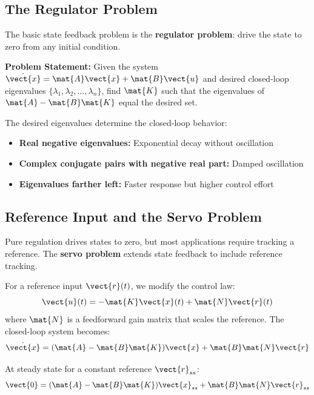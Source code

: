 \subsection{The Regulator Problem}

The basic state feedback problem is the \textbf{regulator problem}: drive the state to zero from any initial condition.

\textbf{Problem Statement:} Given the system $\dot{\vect{x}} = \mat{A}\vect{x} + \mat{B}\vect{u}$ and desired closed-loop eigenvalues $\{\lambda_1, \lambda_2, \ldots, \lambda_n\}$, find $\mat{K}$ such that the eigenvalues of $\mat{A} - \mat{B}\mat{K}$ equal the desired set.

The desired eigenvalues determine the closed-loop behavior:
\begin{itemize}
    \item \textbf{Real negative eigenvalues:} Exponential decay without oscillation
    \item \textbf{Complex conjugate pairs with negative real part:} Damped oscillation
    \item \textbf{Eigenvalues farther left:} Faster response but higher control effort
\end{itemize}


\subsection{Reference Input and the Servo Problem}

Pure regulation drives states to zero, but most applications require tracking a reference. The \textbf{servo problem} extends state feedback to include reference tracking.

For a reference input $\vect{r}(t)$, we modify the control law:
\begin{equation}
\vect{u}(t) = -\mat{K}\vect{x}(t) + \mat{N}\vect{r}(t)
\label{eq:servo_control_law}
\end{equation}
where $\mat{N}$ is a feedforward gain matrix that scales the reference. The closed-loop system becomes:
\begin{equation}
\dot{\vect{x}} = (\mat{A} - \mat{B}\mat{K})\vect{x} + \mat{B}\mat{N}\vect{r}
\end{equation}

At steady state for a constant reference $\vect{r}_{ss}$:
\begin{equation}
\vect{0} = (\mat{A} - \mat{B}\mat{K})\vect{x}_{ss} + \mat{B}\mat{N}\vect{r}_{ss}
\end{equation}

